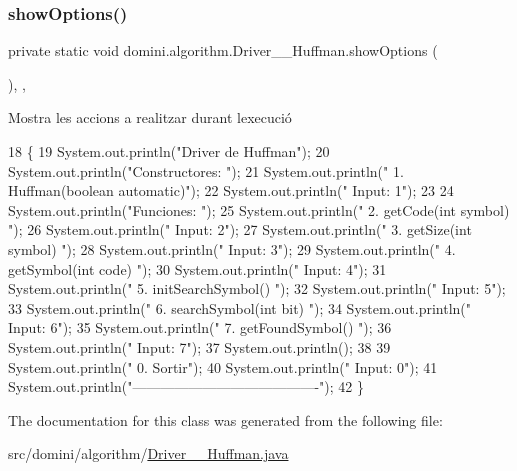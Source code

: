 \subsubsection{\texorpdfstring{show\+Options()}{showOptions()}}
{\footnotesize\ttfamily private static void domini.\+algorithm.\+Driver\+\_\+\+\_\+\+Huffman.\+show\+Options (\begin{DoxyParamCaption}{ }\end{DoxyParamCaption})\hspace{0.3cm}{\ttfamily [inline]}, {\ttfamily [static]}, {\ttfamily [private]}}



Mostra les accions a realitzar durant l\textquotesingle{}execució 


\begin{DoxyCode}
18                                      \{
19         System.out.println(\textcolor{stringliteral}{"Driver de Huffman"});
20         System.out.println(\textcolor{stringliteral}{"Constructores: "});
21         System.out.println(\textcolor{stringliteral}{"     1. Huffman(boolean automatic)"});
22         System.out.println(\textcolor{stringliteral}{"     Input: 1"});
23 
24         System.out.println(\textcolor{stringliteral}{"Funciones: "});
25         System.out.println(\textcolor{stringliteral}{"     2. getCode(int symbol) "});
26         System.out.println(\textcolor{stringliteral}{"     Input: 2"});
27         System.out.println(\textcolor{stringliteral}{"     3. getSize(int symbol) "});
28         System.out.println(\textcolor{stringliteral}{"     Input: 3"});
29         System.out.println(\textcolor{stringliteral}{"     4. getSymbol(int code) "});
30         System.out.println(\textcolor{stringliteral}{"     Input: 4"});
31         System.out.println(\textcolor{stringliteral}{"     5. initSearchSymbol() "});
32         System.out.println(\textcolor{stringliteral}{"     Input: 5"});
33         System.out.println(\textcolor{stringliteral}{"     6. searchSymbol(int bit) "});
34         System.out.println(\textcolor{stringliteral}{"     Input: 6"});
35         System.out.println(\textcolor{stringliteral}{"     7. getFoundSymbol() "});
36         System.out.println(\textcolor{stringliteral}{"     Input: 7"});
37         System.out.println();
38 
39         System.out.println(\textcolor{stringliteral}{"     0. Sortir"});
40         System.out.println(\textcolor{stringliteral}{"     Input: 0"});
41         System.out.println(\textcolor{stringliteral}{"----------------------------------------"});
42     \}
\end{DoxyCode}


The documentation for this class was generated from the following file\+:\begin{DoxyCompactItemize}
\item 
src/domini/algorithm/\hyperlink{Driver____Huffman_8java}{Driver\+\_\+\+\_\+\+Huffman.\+java}\end{DoxyCompactItemize}
